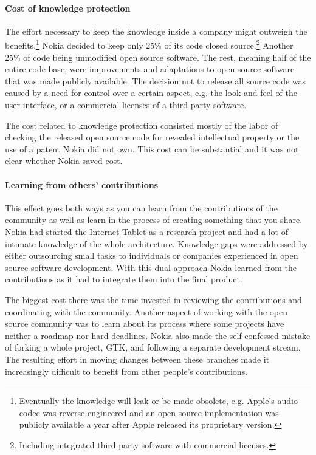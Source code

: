 \documentclass[a4paper]{scrartcl}
\begin{document}
\paragraph{Cost of knowledge protection}
The effort necessary to keep the knowledge inside a company might outweigh the benefits.\footnote{Eventually the knowledge will leak or be made obsolete, e.g. Apple's audio codec was reverse-engineered and an open source implementation was publicly available a year after Apple released its proprietary version.}
Nokia decided to keep only 25\% of its code closed source.\footnote{Including integrated third party software with commercial licenses.} 
Another 25\% of code being unmodified open source software. 
The rest, meaning half of the entire code base, were improvements and adaptations to open source software that was made publicly available.
The decision not to release all source code was caused by a need for control over a certain aspect, e.g. the look and feel of the user interface, or a commercial licenses of a third party software.

The cost related to knowledge protection consisted mostly of the labor of checking the released open source code for revealed intellectual property or the use of a patent Nokia did not own.
This cost can be substantial and it was not clear whether Nokia saved cost.

\paragraph{Learning from others' contributions}
This effect goes both ways as you can learn from the contributions of the community as well as learn in the process of creating something that you share. 
Nokia had started the Internet Tablet as a research project and had a lot of intimate knowledge of the whole architecture.
Knowledge gaps were addressed by either outsourcing small tasks to individuals or companies experienced in open source software development. 
With this dual approach Nokia learned from the contributions as it had to integrate them into the final product.  

The biggest cost there was the time invested in reviewing the contributions and coordinating with the community.
Another aspect of working with the open source community was to learn about its process where some projects have neither a roadmap nor hard deadlines.
Nokia also made the self-confessed mistake of forking a whole project, GTK, and following a separate development stream. 
The resulting effort in moving changes between these branches made it increasingly difficult to benefit from other people's contributions.
\end{document}
